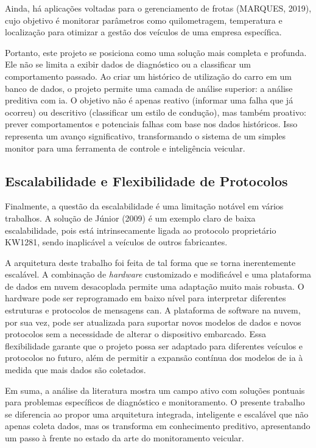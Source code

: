 \documentclass[a4paper, 12pt]{article}
\begin{document}
Ainda, há aplicações voltadas para o gerenciamento de frotas (MARQUES, 2019), cujo objetivo é monitorar parâmetros como quilometragem, temperatura e localização para otimizar a gestão dos veículos de uma empresa específica.

Portanto, este projeto se posiciona como uma solução mais completa e profunda. Ele não se limita a exibir dados de diagnóstico ou a classificar um comportamento passado. Ao criar um histórico de utilização do carro em um banco de dados, o projeto permite uma camada de análise superior: a análise preditiva com \acrshort{ia}. O objetivo não é apenas reativo (informar uma falha que já ocorreu) ou descritivo (classificar um estilo de condução), mas também proativo: prever comportamentos e potenciais falhas com base nos dados históricos. Isso representa um avanço significativo, transformando o sistema de um simples monitor para uma ferramenta de controle e inteligência veicular.

\subsection{Escalabilidade e Flexibilidade de Protocolos}

Finalmente, a questão da escalabilidade é uma limitação notável em vários trabalhos. A solução de Júnior (2009) é um exemplo claro de baixa escalabilidade, pois está intrinsecamente ligada ao protocolo proprietário KW1281, sendo inaplicável a veículos de outros fabricantes.

A arquitetura deste trabalho foi feita de tal forma que se torna inerentemente escalável. A combinação de \textit{hardware} customizado e modificável e uma {plataforma de dados em nuvem} desacoplada permite uma adaptação muito mais robusta. O hardware pode ser reprogramado em baixo nível para interpretar diferentes estruturas e protocolos de mensagens \acrshort{can}. A plataforma de software na nuvem, por sua vez, pode ser atualizada para suportar novos modelos de dados e novos protocolos sem a necessidade de alterar o dispositivo embarcado. Essa flexibilidade garante que o projeto possa ser adaptado para diferentes veículos e protocolos no futuro, além de permitir a expansão contínua dos modelos de \acrshort{ia} à medida que mais dados são coletados.

Em suma, a análise da literatura mostra um campo ativo com soluções pontuais para problemas específicos de diagnóstico e monitoramento. O presente trabalho se diferencia ao propor uma arquitetura integrada, inteligente e escalável que não apenas coleta dados, mas os transforma em conhecimento preditivo, apresentando um passo à frente no estado da arte do monitoramento veicular.
\end{document}
